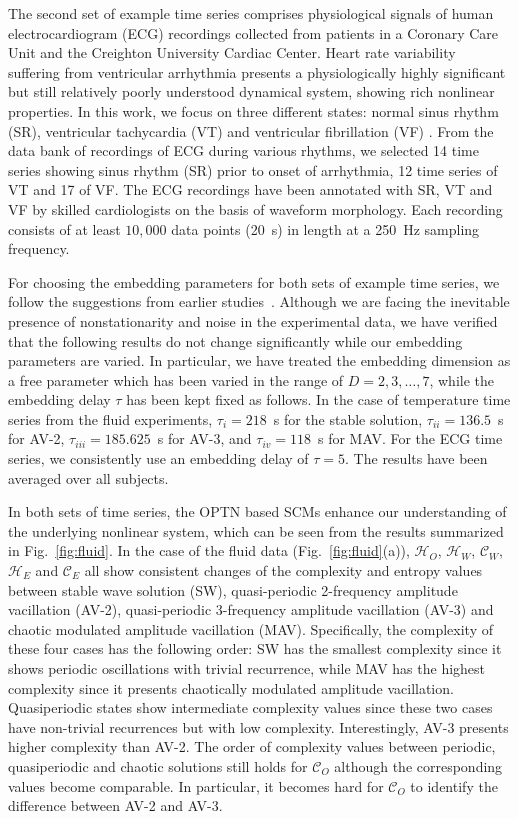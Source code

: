\documentclass[12pt,aip,cha,reprint,nofootinbib]{revtex4-1}
\begin{document}
The second set of example time series comprises physiological signals of human electrocardiogram (ECG) recordings collected from patients in a Coronary Care Unit and the Creighton University Cardiac Center. Heart rate variability suffering from ventricular arrhythmia presents a physiologically highly significant but still relatively poorly understood dynamical system, showing rich nonlinear properties. In this work, we focus on three different states: normal sinus rhythm (SR), ventricular tachycardia (VT) and ventricular fibrillation (VF) \cite{smallCSF2002}. From the data bank of recordings of ECG during various rhythms, we selected 14 time series showing sinus rhythm (SR) prior to onset of arrhythmia, 12 time series of VT and 17 of VF. The ECG recordings have been annotated with SR, VT and VF by skilled cardiologists on the basis of waveform morphology. Each recording consists of at least $10,000$ data points (20~s) in length at a 250~Hz sampling frequency. 

For choosing the embedding parameters for both sets of example time series, we follow the suggestions from earlier studies~\cite{ZouEPJST2008,smallCSF2002}. Although we are facing the inevitable presence of nonstationarity and noise in the experimental data, we have verified that the following results do not change significantly while our embedding parameters are varied. In particular, we have treated the embedding dimension as a free parameter which has been varied in the range of $D = 2, 3, \ldots, 7$, while the embedding delay $\tau$ has been kept fixed as follows. In the case of temperature time series from the fluid experiments, $\tau_{i} = 218$~s for the stable solution, $\tau_{ii} = 136.5$~s  for AV-2, $\tau_{iii} = 185.625$~s for AV-3, and $\tau_{iv} = 118$~s for MAV. For the ECG time series, we consistently use an embedding delay of $\tau = 5$. The results have been averaged over all subjects. 

In both sets of time series, the OPTN based SCMs enhance our understanding of the underlying nonlinear system, which can be seen from the results summarized in Fig.~\ref{fig:fluid}. In the case of the fluid data (Fig.~\ref{fig:fluid}(a)), $\mathcal{H}_O$, $\mathcal{H}_W$, $\mathcal{C}_W$, $\mathcal{H}_E$ and $\mathcal{C}_E$ all show consistent changes of the complexity and entropy values between stable wave solution (SW), quasi-periodic 2-frequency amplitude vacillation (AV-2), quasi-periodic 3-frequency amplitude vacillation (AV-3) and chaotic modulated amplitude vacillation (MAV). Specifically, the complexity of these four cases has the following order: SW has the smallest complexity since it shows periodic oscillations with trivial recurrence, while MAV has the highest complexity since it presents chaotically modulated amplitude vacillation. Quasiperiodic states show intermediate complexity values since these two cases have non-trivial recurrences but with low complexity. Interestingly, AV-3 presents higher complexity than AV-2. The order of complexity values between periodic, quasiperiodic and chaotic solutions still holds for $\mathcal{C}_O$ although the corresponding values become comparable. In particular, it becomes hard for $\mathcal{C}_O$ to identify the difference between AV-2 and AV-3. 
\end{document}
